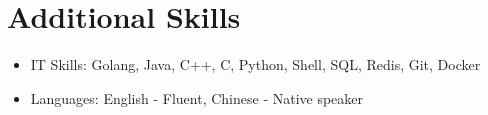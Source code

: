 \documentclass{resume}
\begin{document}


\section{Additional Skills}
\begin{itemize}[parsep=0.5ex]
  \item IT Skills: Golang, Java, C++, C, Python, Shell, SQL, Redis, Git, Docker
  \item Languages: English - Fluent, Chinese - Native speaker
\end{itemize}

%
%
\end{document}
